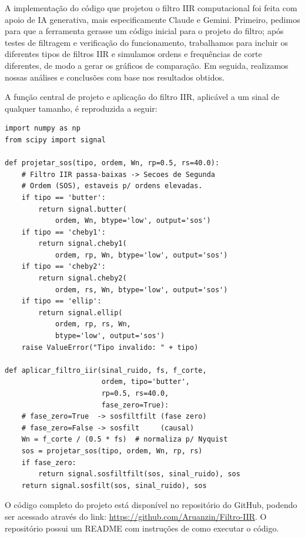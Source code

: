 A implementação do código que projetou o filtro IIR computacional
foi feita com apoio de IA generativa, mais especificamente Claude e Gemini.
Primeiro, pedimos para que a ferramenta gerasse um código inicial
para o projeto do filtro; após testes de filtragem e verificação do
funcionamento, trabalhamos para incluir os diferentes tipos de filtros IIR e
simulamos ordens e frequências de corte diferentes, de modo a gerar os
gráficos de comparação. Em seguida, realizamos nossas análises e conclusões
com base nos resultados obtidos.

A função central de projeto e aplicação do filtro IIR, aplicável a um sinal de
qualquer tamanho, é reproduzida a seguir:

\begin{lstlisting}[basicstyle=\ttfamily\scriptsize]
import numpy as np
from scipy import signal

def projetar_sos(tipo, ordem, Wn, rp=0.5, rs=40.0):
    # Filtro IIR passa-baixas -> Secoes de Segunda
    # Ordem (SOS), estaveis p/ ordens elevadas.
    if tipo == 'butter':
        return signal.butter(
            ordem, Wn, btype='low', output='sos')
    if tipo == 'cheby1':
        return signal.cheby1(
            ordem, rp, Wn, btype='low', output='sos')
    if tipo == 'cheby2':
        return signal.cheby2(
            ordem, rs, Wn, btype='low', output='sos')
    if tipo == 'ellip':
        return signal.ellip(
            ordem, rp, rs, Wn,
            btype='low', output='sos')
    raise ValueError("Tipo invalido: " + tipo)

def aplicar_filtro_iir(sinal_ruido, fs, f_corte,
                       ordem, tipo='butter',
                       rp=0.5, rs=40.0,
                       fase_zero=True):
    # fase_zero=True  -> sosfiltfilt (fase zero)
    # fase_zero=False -> sosfilt     (causal)
    Wn = f_corte / (0.5 * fs)  # normaliza p/ Nyquist
    sos = projetar_sos(tipo, ordem, Wn, rp, rs)
    if fase_zero:
        return signal.sosfiltfilt(sos, sinal_ruido), sos
    return signal.sosfilt(sos, sinal_ruido), sos
\end{lstlisting}

O código completo do projeto está disponível no repositório do GitHub, podendo
ser acessado através do link: \url{https://github.com/Aruanzin/Filtro-IIR}.
O repositório possui um README com instruções de como executar o código.
